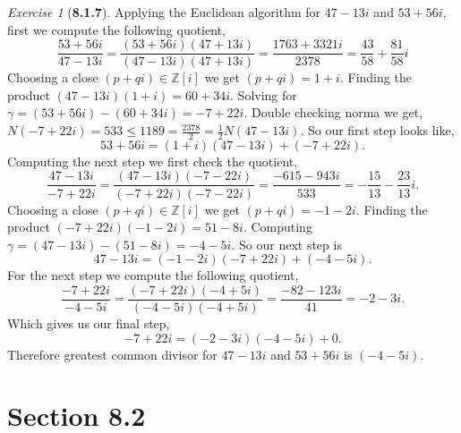 \documentclass[12pt]{amsart}
\makeatletter
\theoremstyle{remark}
\newtheorem*{exercise}{Exercise}%
\def\ZZ{\ensuremath{\mathbb Z}}
\renewenvironment{proof}[1][\proofname]{\par\doublespacing
  \pushQED{\qed}%
  \normalfont \topsep6\p@\@plus6\p@\relax
  \list{}{%
    \settowidth{\leftmargin}{\itshape\proofname:\hskip\labelsep}%
    \setlength{\labelwidth}{0pt}%
    \setlength{\itemindent}{-\leftmargin}%
  }%
  \item[\hskip\labelsep\itshape#1\@addpunct{:}]\ignorespaces
}{%
  \popQED\endlist\@endpefalse
  \singlespacing
}
\theoremstyle{mycomment}
\makeatother
\begin{document}
\begin{exercise}[\textbf{8.1.7}]
\begin{proof}[Solution]
      
      Applying the Euclidean algorithm for $47 - 13i$ and $53 + 56i$, first we compute the following quotient, 
      \begin{equation*}
        \frac{53 + 56i}{47 - 13i} = \frac{(53 + 56i)(47 + 13i)}{(47 - 13i)(47 + 13i)} = \frac{1763 + 3321i}{2378} = \frac{43}{58} + \frac{81}{58}i 
      \end{equation*}
      Choosing a close $(p + qi) \in \ZZ[i]$ we get $(p + qi) = 1 + i$. Finding the product $(47 - 13i)(1 + i) = 60 + 34i$. Solving for $\gamma = (53 + 56i) - (60 + 34i) = -7 + 22i$.
      Double checking norma we get, $N(-7 + 22i) = 533 \leq 1189  = \frac{2378}{2} = \frac{1}{2}N(47 - 13i)$. So our first step looks like, 
      \begin{equation*}
        53 + 56i = (1 + i)(47 - 13i) + (-7 + 22i).
      \end{equation*}
      Computing the next step we first check the quotient, 
      \begin{equation*}
        \frac{47 - 13i}{-7 + 22i} = \frac{(47 - 13i)(-7 - 22i)}{(-7 + 22i)(-7 - 22i)} = \frac{-615 - 943i}{533} = -\frac{15}{13} - \frac{23}{13}i.
      \end{equation*}
      Choosing a close $(p + qi) \in \ZZ[i]$ we get $(p + qi) = -1 - 2i$. Finding the product $(-7 + 22i)( -1 - 2i) = 51 - 8i$. Computing $\gamma = (47 - 13i) - (51 - 8i) = - 4 -5i$.
      So our next step is 
      \begin{equation*}
        47 - 13i = (-1 - 2i)(-7 + 22i) + (-4-5i).
      \end{equation*}
      For the next step we compute the following quotient, 
      \begin{equation*}
        \frac{-7 + 22i}{-4-5i} = \frac{(-7 + 22i)(-4+5i)}{(-4-5i)(-4+5i)} = \frac{-82 - 123 i}{41} = -2 -3i.
      \end{equation*}
      Which gives us our final step, 
      \begin{equation*}
        -7 + 22i = (-2 -3i)(-4-5i) + 0.
      \end{equation*}
      Therefore greatest common divisor for $47 - 13i$ and $53 + 56i$ is $(-4-5i)$.

    \end{proof}

\end{exercise}
\vspace{.5in}




\section*{\textbf{Section 8.2}}
\end{document}
